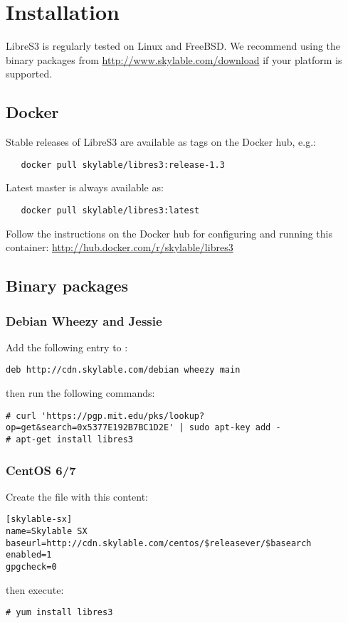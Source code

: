 \chapter{Installation}

LibreS3 is regularly tested on Linux and FreeBSD\@. We recommend using the
binary packages from \url{http://www.skylable.com/download} if your platform
is supported.

\section{Docker}

Stable releases of LibreS3 are available as tags on the Docker hub, e.g.:
\begin{lstlisting}
   docker pull skylable/libres3:release-1.3
\end{lstlisting}

Latest master is always available as:
\begin{lstlisting}
   docker pull skylable/libres3:latest
\end{lstlisting}

Follow the instructions on the Docker hub for configuring and running
this container: \url{http://hub.docker.com/r/skylable/libres3}

\section{Binary packages}

\subsection{Debian Wheezy and Jessie}
Add the following entry to :
\begin{lstlisting}
deb http://cdn.skylable.com/debian wheezy main
\end{lstlisting}
then run the following commands:
\begin{lstlisting}
# curl 'https://pgp.mit.edu/pks/lookup?op=get&search=0x5377E192B7BC1D2E' | sudo apt-key add -
# apt-get install libres3
\end{lstlisting}

\subsection{CentOS 6/7}
Create the file  with this content:
\begin{lstlisting}
[skylable-sx]
name=Skylable SX
baseurl=http://cdn.skylable.com/centos/$releasever/$basearch
enabled=1
gpgcheck=0
\end{lstlisting}
then execute:
\begin{lstlisting}
# yum install libres3
\end{lstlisting}

